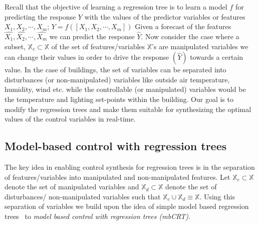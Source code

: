 \documentclass{sig-alternate-ipsn13}
\theoremstyle{definition}
\begin{document}
Recall that the objective of learning a regression tree is to learn a model $f$ for predicting the response $Y$ with the values of the predictor variables or features $X_1, X_2,\cdots, X_m$; \ie $Y=f([X_1, X_2,\cdots, X_m])$
Given a forecast of the features $\hat{X_1}, \hat{X_2},\cdots, \hat{X_m}$ we can predict the response $\hat{Y}$. 
Now consider the case where a subset, $\mathbb{X}_c \subset \mathbb{X}$ of the set of features/variables $\mathbb{X}$'s are manipulated variables \ie we can change their values in order to drive the response $(\hat{Y})$ towards a certain value. 
In the case of buildings, the set of  variables can be separated into disturbances (or non-manipulated) variables like outside air temperature, humidity, wind etc. while the controllable (or manipulated) variables would be the temperature and lighting set-points within the building.
Our goal is to modify the regression trees and make them suitable for synthesizing the optimal values of the control variables in real-time.

\subsection{Model-based control with regression trees}
\label{sec:mbcrt}

The key idea in enabling control synthesis for regression trees is in the separation of features/variables into manipulated and non-manipulated features. 
Let $\mathbb{X}_c \subset \mathbb{X}$ denote the set of manipulated variables and $\mathbb{X}_d \subset \mathbb{X}$ denote the set of disturbances/ non-manipulated variables such that $\mathbb{X}_c \cup \mathbb{X}_d \equiv \mathbb{X}$.
Using this separation of variables we build upon the idea of simple model based regression trees~\cite{friedman1991multivariate} to \emph{model based control with regression trees (mbCRT)}. 
\end{document}
